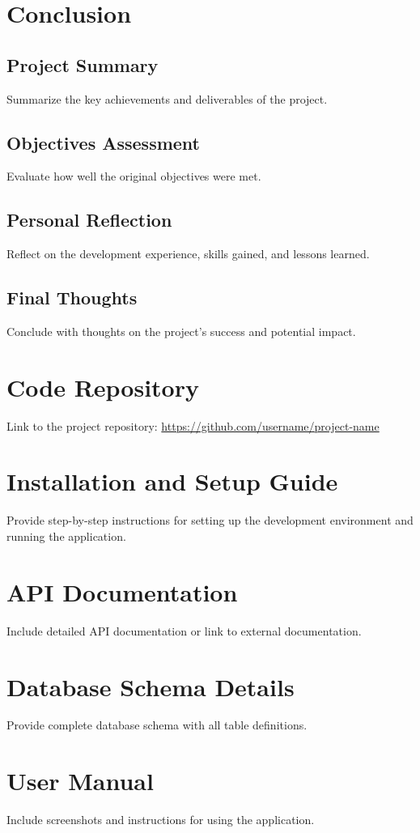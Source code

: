 \documentclass[12pt,a4paper]{article}
\begin{document}
\section{Conclusion}
\label{sec:conclusion}

\subsection{Project Summary}
Summarize the key achievements and deliverables of the project.

\subsection{Objectives Assessment}
Evaluate how well the original objectives were met.

\subsection{Personal Reflection}
Reflect on the development experience, skills gained, and lessons learned.

\subsection{Final Thoughts}
Conclude with thoughts on the project's success and potential impact.




\appendix

\section{Code Repository}
\label{app:code-repo}
Link to the project repository: \url{https://github.com/username/project-name}

\section{Installation and Setup Guide}
\label{app:installation}
Provide step-by-step instructions for setting up the development environment and running the application.

\section{API Documentation}
\label{app:api-docs}
Include detailed API documentation or link to external documentation.

\section{Database Schema Details}
\label{app:db-schema}
Provide complete database schema with all table definitions.

\section{User Manual}
\label{app:user-manual}
Include screenshots and instructions for using the application.
\end{document}
